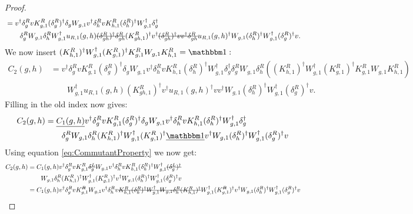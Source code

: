 \documentclass[11pt,a4paper,twoside]{article}
\numberwithin{equation}{section}
\begin{document}
\begin{proof}
\begin{align}
			&=v^\dagger \delta_g^R v K_{g,1}^R (\delta_g^R)^\dagger \delta_g W_{g,1}v^\dagger \delta_h^R v K_{h,1}^R (\delta_h^R)^\dagger W_{g,1}^\dagger \delta_g^\dagger\\
			\nonumber
			&\qquad \delta_g^R W_{g,1}\delta_h^R W_{g,1}^\dagger u_{R,1}(g,h)\stkout{(\delta_{gh}^R)^\dagger \delta_{gh}^R} (K_{gh,1}^R)^\dagger v^\dagger \stkout{(\delta_{gh}^R)^\dagger v  v^\dagger \delta^R_{gh}} u_{R,1}(g,h)^\dagger W_{g,1}(\delta^R_h)^\dagger W_{g,1}^\dagger(\delta_g^R)^\dagger v.
		\end{align}
		We now insert $(K_{h,1}^R)^\dagger W_{g,1}^\dagger (K_{g,1}^R)^\dagger K_{g,1}^R W_{g,1}K_{h,1}^R=\id:$
		\begin{align}
			\nonumber
			C_2(g,h)&=v^\dagger \delta_g^R v K_{g,1}^R (\delta_g^R)^\dagger \delta_g W_{g,1}v^\dagger \delta_h^R v K_{h,1}^R (\delta_h^R)^\dagger W_{g,1}^\dagger \delta_g^\dagger\delta_g^R W_{g,1}\delta_h^R \left((K_{h,1}^R)^\dagger W_{g,1}^\dagger (K_{g,1}^R)^\dagger K_{g,1}^R W_{g,1}K_{h,1}^R\right)\\	
			&\qquad  W_{g,1}^\dagger u_{R,1}(g,h) (K_{gh,1}^R)^\dagger v^\dagger u_{R,1}(g,h)^\dagger v v^\dagger W_{g,1}(\delta^R_h)^\dagger W_{g,1}^\dagger(\delta_g^R)^\dagger v.
		\end{align}
		Filling in the old index now gives:
		\begin{align}
			C_2(g,h)&=\underline{C_1(g,h)}v^\dagger \delta_g^R v K_{g,1}^R (\delta_g^R)^\dagger \delta_g W_{g,1}v^\dagger \delta_h^R v K_{h,1}^R (\delta_h^R)^\dagger W_{g,1}^\dagger \delta_g^\dagger\\
			\nonumber
			&\qquad \delta_g^R W_{g,1}\delta_h^R (K_{h,1}^R)^\dagger W_{g,1}^\dagger (K_{g,1}^R)^\dagger \underline{\id} v^\dagger W_{g,1}(\delta^R_h)^\dagger W_{g,1}^\dagger(\delta_g^R)^\dagger v
		\end{align}
		Using equation \eqref{eq:CommutantProperty} we now get:
		\begin{align}
			C_2(g,h)&=C_1(g,h)v^\dagger \delta_g^R v K_{g,1}^R \stkout{\delta_g^L} W_{g,1}v^\dagger \delta_h^R v K_{h,1}^R (\delta_h^R)^\dagger W_{g,1}^\dagger \stkout{(\delta_g^L)^\dagger}\\
			\nonumber
			&\qquad  W_{g,1}\delta_h^R (K_{h,1}^R)^\dagger W_{g,1}^\dagger (K_{g,1}^R)^\dagger v^\dagger W_{g,1}(\delta^R_h)^\dagger W_{g,1}^\dagger(\delta_g^R)^\dagger v\\
			&=C_1(g,h)v^\dagger \delta_g^R v K_{g,1}^\stkout{R} W_{g,1}v^\dagger \delta_h^R v \stkout{K_{h,1}^R (\delta_h^R)^\dagger W_{g,1}^\dagger W_{g,1}\delta_h^R (K_{h,1}^R)^\dagger} W_{g,1}^\dagger (K_{g,1}^\stkout{R})^\dagger v^\dagger W_{g,1}(\delta^R_h)^\dagger W_{g,1}^\dagger(\delta_g^R)^\dagger v\\

\end{align}
\end{proof}
\end{document}
